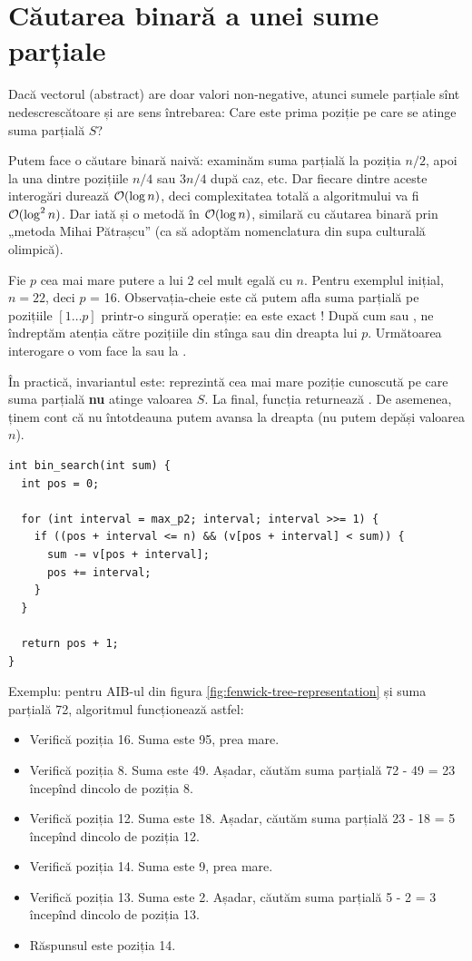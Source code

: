 \documentclass[../main.tex]{subfiles}
\begin{document}
\section{Căutarea binară a unei sume parțiale}

Dacă vectorul (abstract) are doar valori non-negative, atunci sumele parțiale sînt nedescrescătoare și are sens întrebarea: Care este prima poziție pe care se atinge suma parțială $S$?

Putem face o căutare binară naivă: examinăm suma parțială la poziția $n/2$, apoi la una dintre pozițiile $n/4$ sau $3n/4$ după caz, etc. Dar fiecare dintre aceste interogări durează $\mathcal{O}(\log n)$, deci complexitatea totală a algoritmului va fi $\mathcal{O}(\log^2 n)$. Dar iată și o metodă în $\mathcal{O}(\log n)$, similară cu căutarea binară prin „metoda Mihai Pătrașcu” (ca să adoptăm nomenclatura din supa culturală olimpică).

Fie $p$ cea mai mare putere a lui 2 cel mult egală cu $n$. Pentru exemplul inițial, $n = 22$, deci $p$ = 16. Observația-cheie este că putem afla suma parțială pe pozițiile $[1 \dots p]$ printr-o singură operație: ea este exact ! După cum  sau , ne îndreptăm atenția către pozițiile din stînga sau din dreapta lui $p$. Următoarea interogare o vom face la  sau la .

În practică, invariantul este:  reprezintă cea mai mare poziție cunoscută pe care suma parțială \textbf{nu} atinge valoarea $S$. La final, funcția returnează . De asemenea, ținem cont că nu întotdeauna putem avansa la dreapta (nu putem depăși valoarea $n$).

\begin{verbatim}
int bin_search(int sum) {
  int pos = 0;

  for (int interval = max_p2; interval; interval >>= 1) {
    if ((pos + interval <= n) && (v[pos + interval] < sum)) {
      sum -= v[pos + interval];
      pos += interval;
    }
  }

  return pos + 1;
}
\end{verbatim}

Exemplu: pentru AIB-ul din figura \ref{fig:fenwick-tree-representation} și suma parțială 72, algoritmul funcționează astfel:

\begin{itemize}
  \item Verifică poziția 16. Suma este 95, prea mare.
  \item Verifică poziția 8. Suma este 49. Așadar, căutăm suma parțială 72 - 49 = 23 începînd dincolo de poziția 8.
  \item Verifică poziția 12. Suma este 18. Așadar, căutăm suma parțială 23 - 18 = 5 începînd dincolo de poziția 12.
  \item Verifică poziția 14. Suma este 9, prea mare.
  \item Verifică poziția 13. Suma este 2. Așadar, căutăm suma parțială 5 - 2 = 3 începînd dincolo de poziția 13.
  \item Răspunsul este poziția 14.
\end{itemize}
\end{document}
